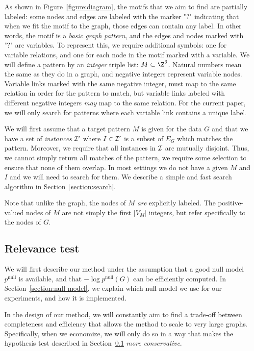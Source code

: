 \documentclass[11pt]{article}
\begin{document}
As shown in Figure~\ref{figure:diagram}, the motifs that we aim to find are partially labeled: some nodes and edges are labeled with the marker "?" indicating that when we fit the motif to the graph, those edges can contain any label. In other words, the motif is a \emph{basic graph pattern}, and the edges and nodes marked with "?" are variables. To represent this, we require additional symbols: one for variable relations, and one for each node in the motif marked with a variable. We will define a pattern by an \emph{integer} triple list: $M \subset \Z^3$. Natural numbers mean the same as they do in a graph, and negative integers represent variable nodes. Variable links marked with the same negative integer, must map to the same relation in order for the pattern to match, but variable links labeled with different negative integers \emph{may} map to the same relation. For the current paper, we will only search for patterns where each variable link contains a unique label.

We will first assume that a target pattern $M$ is given for the data $G$ and that we have a set of \emph{instances} $\cal I'$ where $I \in \cal I'$ is a subset of $E_G$ which matches the pattern. Moreover, we require that all instances in $\cal I$ are mutually disjoint. Thus, we cannot simply return all matches of the pattern, we require some selection to ensure that none of them overlap. In most settings we do not have a given $M$ and $I$ and we will need to search for them. We describe a simple and fast search algorithm in Section~\ref{section:search}.

Note that unlike the graph, the nodes of $M$ \emph{are} explicitly labeled. The positive-valued nodes of $M$ are not simply the first $|V_M|$ integers, but refer specifically to the nodes of $G$.

\subsection{Relevance test}

\label{section:relevance-test}

We will first describe our method under the assumption that a good null model $p^\text{null}$ is available, and that $- \log p^\text{null}(G)$ can be efficiently computed. In Section~\ref{section:null-model}, we explain which null model we use for our experiments, and how it is implemented. 


In the design of our method, we will constantly aim to find a trade-off between completeness and efficiency that allows the method to scale to very large graphs. Specifically, when we economize, we will only do so in a way that makes the hypothesis test described in Section~\ref{section:relevance-test} \emph{more conservative}.
\end{document}
